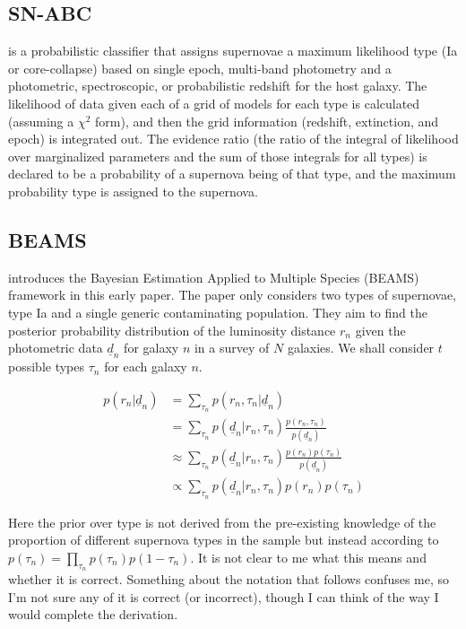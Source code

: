 \documentclass[12pt, onecolumn]{emulateapj}
\newcommand{\textul}{\underline}
\begin{document}
\subsection{SN-ABC}

\citet{Poznanski06} is a probabilistic classifier that assigns supernovae a maximum likelihood type (Ia or core-collapse) based on single epoch, multi-band photometry and a photometric, spectroscopic, or probabilistic redshift for the host galaxy.  The likelihood of data given each of a grid of models for each type is calculated (assuming a $\chi^{2}$ form), and then the grid information (redshift, extinction, and epoch) is integrated out.  The evidence ratio (the ratio of the integral of likelihood over marginalized parameters and the sum of those integrals for all types) is declared to be a probability of a supernova being of that type, and the maximum probability type is assigned to the supernova.

\subsection{BEAMS}

\citet{Kunz07} introduces the Bayesian Estimation Applied to Multiple Species (BEAMS) framework in this early paper.  The paper only considers two types of supernovae, type Ia and a single generic contaminating population.  They aim to find the posterior probability distribution of the luminosity distance $r_{n}$ given the photometric data $\textul{d}_{n}$ for galaxy $n$ in a survey of $N$ galaxies.  We shall consider $t$ possible types $\tau_{n}$ for each galaxy $n$.

\begin{align*}
p(r_{n}|\textul{d}_{n}) &= \sum_{\tau_{n}}p(r_{n},\tau_{n}|\textul{d}_{n})\\
&= \sum_{\tau_{n}}p(\textul{d}_{n}|r_{n},\tau_{n})\frac{p(r_{n},\tau_{n})}{p(\textul{d}_{n})}\\
&\approx \sum_{\tau_{n}}p(\textul{d}_{n}|r_{n},\tau_{n})\frac{p(r_{n})p(\tau_{n})}{p(\textul{d}_{n})}\\
&\propto \sum_{\tau_{n}}p(\textul{d}_{n}|r_{n},\tau_{n})p(r_{n})p(\tau_{n})
\end{align*}

Here the prior over type is not derived from the pre-existing knowledge of the proportion of different supernova types in the sample but instead according to $p(\tau_{n})=\prod_{\tau_{n}}p(\tau_{n})p(1-\tau_{n})$.  It is not clear to me what this means and whether it is correct.  Something about the notation that follows confuses me, so I'm not sure any of it is correct (or incorrect), though I can think of the way I would complete the derivation.
\end{document}
